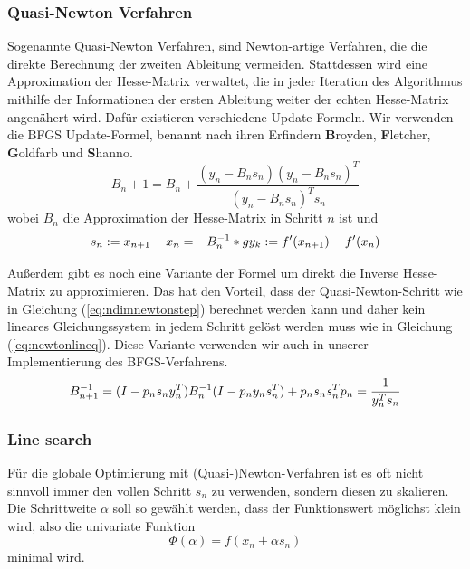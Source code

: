 \documentclass[runningheads,a4paper]{llncs}
\begin{document}
\subsubsection{Quasi-Newton Verfahren}
Sogenannte Quasi-Newton Verfahren, sind Newton-artige Verfahren, die die direkte Berechnung der zweiten Ableitung vermeiden. Stattdessen wird eine Approximation der Hesse-Matrix verwaltet, die in jeder Iteration des Algorithmus mithilfe der Informationen der ersten Ableitung weiter der echten Hesse-Matrix angenähert wird. Dafür existieren verschiedene Update-Formeln. Wir verwenden die BFGS Update-Formel, benannt nach ihren Erfindern \textbf{B}royden, \textbf{F}letcher, \textbf{G}oldfarb und \textbf{S}hanno. \cite{nocedal1999numerical}
\begin{equation*}
B_n+1 = B_n + \frac{(y_n- B_ns_n) (y_n-B_ns_n)^T}{(y_n- B_n s_n)^T s_n}
\end{equation*}
wobei $B_n$ die Approximation der Hesse-Matrix in Schritt $n$ ist und
\begin{equation*}
s_n := x_{n+1} - x_n = -B_n^{-1}*g\\
y_k := f'(x_{n+1}) - f'(x_n)
\end{equation*}

Außerdem gibt es noch eine Variante der Formel um direkt die Inverse Hesse-Matrix zu approximieren. Das hat den Vorteil, dass der Quasi-Newton-Schritt wie in Gleichung (\ref{eq:ndimnewtonstep}) berechnet werden kann und daher kein lineares Gleichungssystem in jedem Schritt gelöst werden muss wie in Gleichung (\ref{eq:newtonlineq}). Diese Variante verwenden wir auch in unserer Implementierung des BFGS-Verfahrens.
\begin{equation}
\label{eq:bfgsinverse}
B_{n+1}^{-1} = (I - p_n s_n y_n^T) B_n^{-1} (I - p_n y_n s_n^T) + p_n s_n s_n^T \\ p_n = \frac{1}{y_n^Ts_n}
\end{equation}

\subsubsection{Line search}
Für die globale Optimierung mit (Quasi-)Newton-Verfahren ist es oft nicht sinnvoll immer den vollen Schritt $s_n$ zu verwenden, sondern diesen zu skalieren. Die Schrittweite $\alpha$ soll so gewählt werden, dass der Funktionswert möglichst klein wird, also die univariate Funktion
\begin{equation*}
\Phi(\alpha) = f(x_n + \alpha s_n)
\end{equation*}
minimal wird.
\end{document}
